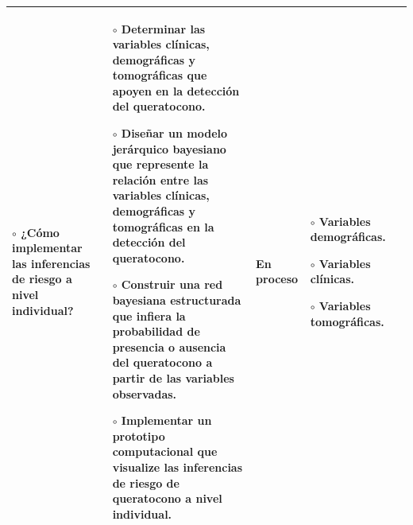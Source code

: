 \begin{landscape}
\begin{table}[h!]
\begin{tabular}{|p{4.2cm}|p{4.5cm}|p{4.5cm}|p{3cm}|p{4.2cm}|}
{    $\circ$ ¿Cómo implementar las inferencias de riesgo a nivel individual?} & \multicolumn{1}{p{4.5cm}|}{
    $\circ$ Determinar las variables clínicas, demográficas y tomográficas que apoyen en la detección del queratocono.\vspace{0.2cm}

    $\circ$ Diseñar un modelo jerárquico bayesiano que represente la relación entre las variables clínicas, demográficas y tomográficas en la detección del queratocono.\vspace{0.2cm}

    $\circ$ Construir una red bayesiana estructurada que infiera la probabilidad de presencia o ausencia del queratocono a partir de las variables observadas.\vspace{0.2cm}

    $\circ$ Implementar un prototipo computacional que visualize las inferencias de riesgo de queratocono a nivel individual.

    } & \multicolumn{1}{p{4.5cm}|}{
    En proceso

    } & \multicolumn{1}{p{3cm}|}{
    \vspace{0.2cm}
    $\circ$ Variables demográficas.\vspace{0.2cm}

    $\circ$ Variables clínicas.\vspace{0.2cm}

    $\circ$ Variables tomográficas.
    }  & \\ \hline
\end{tabular}
\end{table}

\end{landscape}

